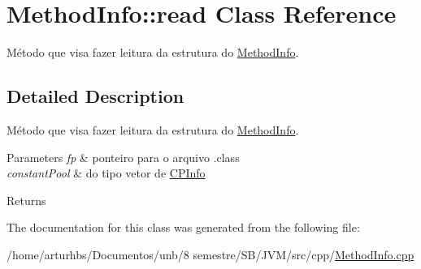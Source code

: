 \hypertarget{classMethodInfo_1_1read}{}\section{Method\+Info\+:\+:read Class Reference}
\label{classMethodInfo_1_1read}


Método que visa fazer leitura da estrutura do \hyperlink{classMethodInfo}{Method\+Info}.  




\subsection{Detailed Description}
Método que visa fazer leitura da estrutura do \hyperlink{classMethodInfo}{Method\+Info}. 


\begin{DoxyParams}{Parameters}
{\em fp} & ponteiro para o arquivo .class \\
\hline
{\em constant\+Pool} & do tipo vetor de \hyperlink{classCPInfo}{C\+P\+Info} \\
\hline
\end{DoxyParams}
\begin{DoxyReturn}{Returns}

\end{DoxyReturn}


The documentation for this class was generated from the following file\+:\begin{DoxyCompactItemize}
\item 
/home/arturhbs/\+Documentos/unb/8 semestre/\+S\+B/\+J\+V\+M/src/cpp/\hyperlink{MethodInfo_8cpp}{Method\+Info.\+cpp}\end{DoxyCompactItemize}
